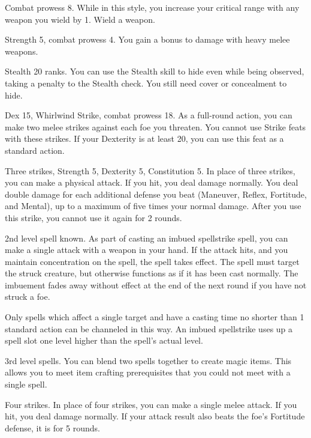 \featpre Combat prowess 8.
\featben While in this style, you increase your critical range with any weapon you wield by 1.
\stylereq Wield a weapon.

\featpres Strength 5, combat prowess 4.
\featben You gain a  bonus to damage with heavy melee weapons.

\featpre Stealth 20 ranks.
\featben You can use the Stealth skill to hide even while being observed, taking a  penalty to the Stealth check.
You still need cover or concealment to hide.

\featpres Dex 15, Whirlwind Strike, combat prowess 18.
\featben As a full-round action, you can make two melee strikes against each foe you threaten. You cannot use Strike feats with these strikes.
If your Dexterity is at least 20, you can use this feat as a standard action.

\featpres Three strikes, Strength 5, Dexterity 5, Constitution 5.
\featben In place of three strikes, you can make a physical attack.
If you hit, you deal damage normally.
You deal double damage for each additional defense you beat (Maneuver, Reflex, Fortitude, and Mental), up to a maximum of five times your normal damage.
After you use this strike, you cannot use it again for 2 rounds.

\featpre 2nd level spell known.
\featben As part of casting an imbued spellstrike spell, you can make a single attack with a weapon in your hand.
If the attack hits, and you maintain concentration on the spell, the spell takes effect.
The spell must target the struck creature, but otherwise functions as if it has been cast normally.
The imbuement fades away without effect at the end of the next round if you have not struck a foe.

Only spells which affect a single target and have a casting time no shorter than 1 standard action can be channeled in this way.
An imbued spellstrike uses up a spell slot one level higher than the spell's actual level.

\featpre 3rd level spells.
\featben You can blend two spells together to create magic items.
This allows you to meet item crafting prerequisites that you could not meet with a single spell.

\featpre Four strikes.
\featben In place of four strikes, you can make a single melee attack.
If you hit, you deal damage normally.
If your attack result also beats the foe's Fortitude defense, it is \immobilized for 5 rounds.

